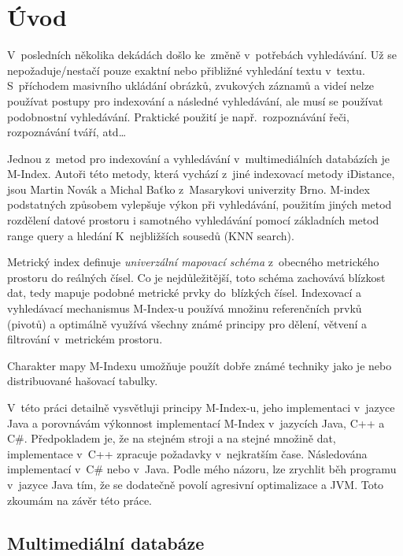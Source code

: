 \chapter{Úvod}

V~posledních několika dekádách došlo ke~změně v~potřebách vyhledávání.
Už se nepožaduje/nestačí pouze exaktní nebo přibližné vyhledání textu
v~textu. S~příchodem masivního ukládání obrázků, zvukových záznamů
a videí nelze používat  postupy pro indexování a následné
vyhledávání, ale musí se používat podobnostní vyhledávání. Praktické
použití je např.~rozpoznávání řeči, rozpoznávání tváří, atd\ldots{}

Jednou z~metod pro indexování a vyhledávání v~multimediálních databázích
je M-Index\cite{Novak:2009:MIE:1637863.1638184}\@. Autoři této
metody, která vychází z~jiné indexovací metody iDistance\cite{Jagadish:2005:IAB:1071610.1071612},
jsou Martin Novák a Michal Baťko z~Masarykovi univerzity Brno\@.
M-index podstatných způsobem vylepšuje výkon při vyhledávání, použitím
jiných metod rozdělení datové prostoru i samotného vyhledávání pomocí
základních metod range query a hledání K~nejbližších sousedů (KNN
search)\@.

Metrický index definuje \emph{univerzální mapovací schéma} z~obecného
metrického prostoru do reálných čísel\@. Co je nejdůležitější, toto
schéma zachovává blízkost dat, tedy mapuje podobné metrické prvky
do~blízkých čísel\@. Indexovací a vyhledávací mechanismus M-Index-u
používá množinu referenčních prvků (pivotů) a optimálně využívá všechny
známé principy pro dělení, větvení a filtrování v~metrickém prostoru\@.

Charakter mapy M-Indexu umožňuje použít dobře známé techniky jako
je \BPTree\cite{Cormen:2001:IA:580470} nebo distribuované
hašovací tabulky\@.

V~této práci detailně vysvětluji principy M-Index-u, jeho implementaci
v~jazyce Java a porovnávám výkonnost implementací M-Index v~jazycích
Java, C++ a C\#. Předpokladem je, že na stejném stroji a na stejné
množině dat, implementace v~C++ zpracuje požadavky v~nejkratším
čase. Následována implementací v~C\# nebo v~Java. Podle mého názoru,
lze zrychlit běh programu v~jazyce Java tím, že se dodatečně povolí
agresivní optimalizace a  JVM. Toto zkoumám na závěr této práce.

\section{Multimediální databáze}

